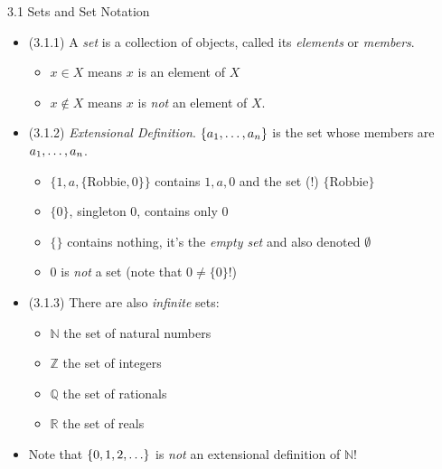 \begin{frame}{3.1 Sets and Set Notation}

	\begin{itemize}
	
		\item (3.1.1) A \emph{set} is a collection of objects, called its \emph{elements} or \emph{members}.
		
		\begin{itemize}
		
			\item $x\in X$ means $x$ is an element of $X$
			
			\item $x\notin X$ means $x$ is \emph{not} an element of $X$.
		
		\end{itemize}
		
		\item (3.1.2) \emph{Extensional Definition}. $\{a_1, \mathellipsis, a_n\}$ is the set whose members are $a_1, \mathellipsis, a_n$.
		
		\begin{itemize}
		
			\item  $\{1,a, \{\text{Robbie},0\}\}$ contains $1,a,0$ and the set (!) $ \{\text{Robbie}\}$
			
			\item $\{0\}$, singleton 0, contains only $0$			
			\item $\{ \}$ contains nothing, it's the \emph{empty set} and also denoted $\emptyset$
			
			\item $0$ is \emph{not} a set (note that $0\neq \{0\}$!)
		
		\end{itemize}

		\item (3.1.3) There are also \emph{infinite} sets:		
		
			\begin{itemize}
			
				\item $\mathbb{N}$ the set of natural numbers
				
				\item $\mathbb{Z}$ the set of integers
				
				\item $\mathbb{Q}$ the set of rationals
				
				\item $\mathbb{R}$ the set of reals
			
			\end{itemize} 
			
		\item Note that  $\{0,1,2,\mathellipsis\}$ is \emph{not} an extensional definition of $\mathbb{N}$! 
		
	\end{itemize}

\end{frame}

